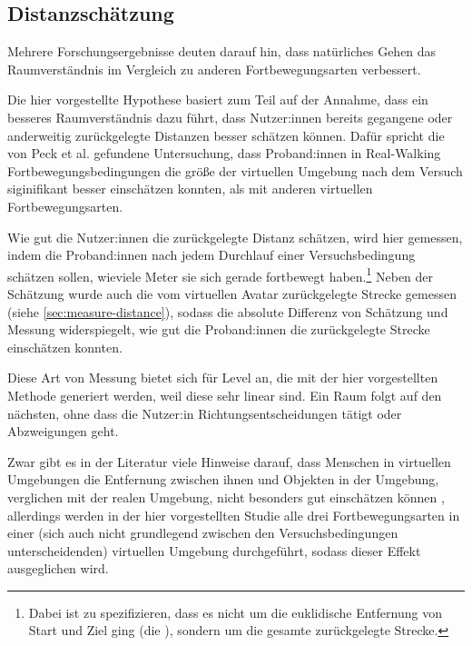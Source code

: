         \subsection{Distanzschätzung}
            Mehrere Forschungsergebnisse deuten darauf hin, dass natürliches Gehen das Raumverständnis im Vergleich zu anderen Fortbewegungsarten verbessert. \cite{langbehn-vergleich-2018,peck-vergleich-2011, walking-improves-map-building} %

            Die hier vorgestellte Hypothese basiert zum Teil auf der Annahme, dass ein besseres Raumverständnis dazu führt, dass Nutzer:innen bereits gegangene oder anderweitig zurückgelegte Distanzen besser schätzen können. Dafür spricht die von Peck et al. \cite{peck-vergleich-2011} gefundene Untersuchung, dass Proband:innen in Real-Walking Fortbewegungsbedingungen die größe der virtuellen Umgebung nach dem Versuch siginifikant besser einschätzen konnten, als mit anderen virtuellen Fortbewegungsarten.

            Wie gut die Nutzer:innen die zurückgelegte Distanz schätzen, wird hier gemessen, indem die Proband:innen nach jedem Durchlauf einer Versuchsbedingung schätzen sollen, wieviele Meter sie sich gerade fortbewegt haben.\footnote{Dabei ist zu spezifizieren, dass es nicht um die euklidische Entfernung von Start und Ziel ging (die ), sondern um die gesamte zurückgelegte Strecke.}
            Neben der Schätzung wurde auch die vom virtuellen Avatar zurückgelegte Strecke gemessen (siehe \autoref{sec:measure-distance}), sodass die absolute Differenz von Schätzung und Messung widerspiegelt, wie gut die Proband:innen die zurückgelegte Strecke einschätzen konnten.

            Diese Art von Messung bietet sich für Level an, die mit der hier vorgestellten Methode generiert werden, weil diese sehr linear sind. Ein Raum folgt auf den nächsten, ohne dass die Nutzer:in Richtungsentscheidungen tätigt oder Abzweigungen geht.

            Zwar gibt es in der Literatur viele Hinweise darauf, dass Menschen in virtuellen Umgebungen die Entfernung zwischen ihnen und Objekten in der Umgebung, verglichen mit der realen Umgebung, nicht besonders gut einschätzen können \cite{meta-distance-perception, bruder-distance}, %
            allerdings werden in der hier vorgestellten Studie alle drei Fortbewegungsarten in einer (sich auch nicht grundlegend zwischen den Versuchsbedingungen unterscheidenden) virtuellen Umgebung durchgeführt, sodass dieser Effekt ausgeglichen wird.

